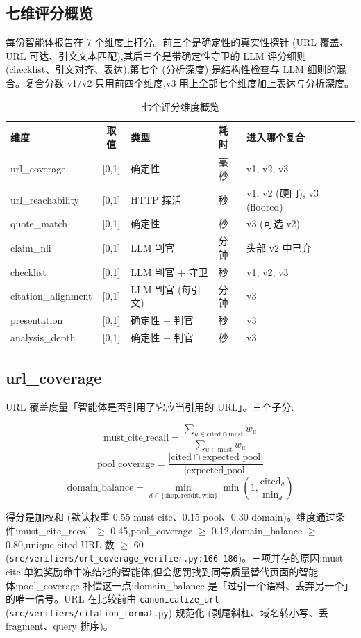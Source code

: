 \documentclass[UTF8,a4paper,12pt,oneside]{ctexart}
\begin{document}
\subsection{七维评分概览}

每份智能体报告在 7 个维度上打分。前三个是确定性的真实性探针 (URL 覆盖、URL 可达、引文文本匹配),其后三个是带确定性守卫的 LLM 评分细则 (checklist、引文对齐、表达),第七个 (分析深度) 是结构性检查与 LLM 细则的混合。复合分数 v1/v2 只用前四个维度,v3 用上全部七个维度加上表达与分析深度。

\begin{table}[ht]
\centering
\small
\caption{七个评分维度概览}
\begin{tabular}{l c l l l}
\toprule
维度 & 取值 & 类型 & 耗时 & 进入哪个复合 \\
\midrule
url\_coverage & [0,1] & 确定性 & 毫秒 & v1, v2, v3 \\
url\_reachability & [0,1] & HTTP 探活 & 秒 & v1, v2 (硬门), v3 (floored) \\
quote\_match & [0,1] & 确定性 & 秒 & v3 (可选 v2) \\
claim\_nli & [0,1] & LLM 判官 & 分钟 & 头部 v2 中已弃 \\
checklist & [0,1] & LLM 判官 + 守卫 & 秒 & v1, v2, v3 \\
citation\_alignment & [0,1] & LLM 判官 (每引文) & 分钟 & v3 \\
presentation & [0,1] & 确定性 + 判官 & 秒 & v3 \\
analysis\_depth & [0,1] & 确定性 + 判官 & 秒 & v3 \\
\bottomrule
\end{tabular}
\end{table}

\subsection{url\_coverage}

URL 覆盖度量「智能体是否引用了它应当引用的 URL」。三个子分:

\[
\text{must\_cite\_recall} = \frac{\sum_{u \in \text{cited} \cap \text{must}} w_u}{\sum_{u \in \text{must}} w_u}
\]
\[
\text{pool\_coverage} = \frac{|\text{cited} \cap \text{expected\_pool}|}{|\text{expected\_pool}|}
\]
\[
\text{domain\_balance} = \min_{d \in \{\text{shop}, \text{reddit}, \text{wiki}\}} \min\!\left(1, \frac{\text{cited}_d}{\text{min}_d}\right)
\]

得分是加权和 (默认权重 0.55 must-cite、0.15 pool、0.30 domain)。维度通过条件:must\_cite\_recall \(\geq\) 0.45,pool\_coverage \(\geq\) 0.12,domain\_balance \(\geq\) 0.80,unique cited URL 数 \(\geq\) 60 (\texttt{src/verifiers/url\_coverage\_verifier.py:166-186})。三项并存的原因:must-cite 单独奖励命中冻结池的智能体,但会惩罚找到同等质量替代页面的智能体;pool\_coverage 补偿这一点;domain\_balance 是「过引一个语料、丢弃另一个」的唯一信号。URL 在比较前由 \texttt{canonicalize\_url} (\texttt{src/verifiers/citation\_format.py}) 规范化 (剥尾斜杠、域名转小写、丢 fragment、query 排序)。
\end{document}
